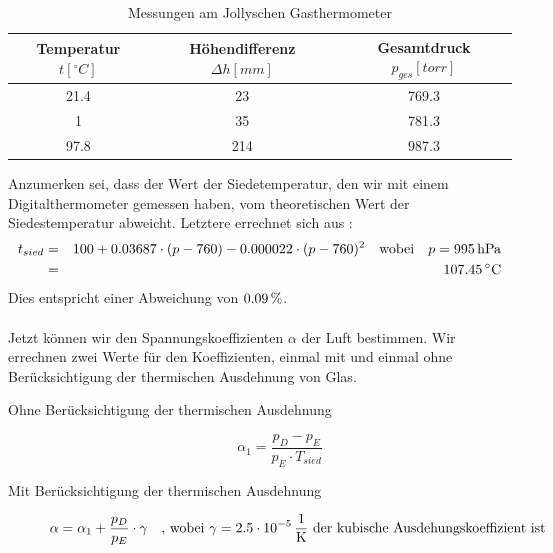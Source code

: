 \documentclass[a4paper,titlepage]{scrartcl}
\numberwithin{equation}{section}
\begin{document}
\begin{table}[H]
\begin{tabular}{c|c|c}
	Temperatur $t [^{\circ} C]$ & Höhendifferenz $\Delta h [mm]$ & Gesamtdruck $p_{ges} [torr]$ \\
	\hline
	21.4 & 23 & 769.3 \\
	1 & 35 & 781.3 \\
	97.8 & 214 & 987.3 \\
\end{tabular}
\caption{Messungen am Jollyschen Gasthermometer}
\label{tab:aufgabe1}
\end{table}

Anzumerken sei, dass der Wert der Siedetemperatur, den wir mit einem Digitalthermometer gemessen haben, vom theoretischen Wert der Siedestemperatur abweicht. Letztere errechnet sich aus \cite{auswertung1}:
\begin{eqnarray*}
t_{sied}&=&100 + 0.03687 \cdot (p - 760) - 0.000022 \cdot (p-760)^2 \quad \text{wobei} \quad p = \unit[995]{hPa}\\
&=&\unit[107.45]{^{\circ} C}
\end{eqnarray*}
Dies entspricht einer Abweichung von $\unit[0.09]{\%}$.\\ \\
Jetzt können wir den Spannungskoeffizienten $\alpha$ der Luft bestimmen. Wir errechnen zwei Werte für den Koeffizienten, einmal mit und einmal ohne Berücksichtigung der thermischen Ausdehnung von Glas.

\begin{description}
\item[Ohne Berücksichtigung der thermischen Ausdehnung]
\begin{equation*}
\alpha_1=\frac{p_D - p_E}{p_E \cdot T_{sied}}
\end{equation*}
\item[Mit Berücksichtigung der thermischen Ausdehnung]
\begin{equation*}
\alpha = \alpha_1 + \frac{p_D}{p_E} \cdot \gamma \quad \text{, wobei $ \gamma=\unit[2.5 \cdot 10^{-5}]{\frac{1}{K}} $ der kubische Ausdehungskoeffizient ist }
\end{equation*}
\end{description}
\end{document}
